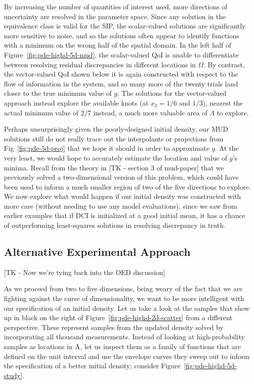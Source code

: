 By increasing the number of quantities of interest used, more directions of uncertainty are resolved in the parameter space.
Since any solution in the equivalence class is valid for the SIP, the scalar-valued solutions are significantly more sensitive to noise, and so the solutions often appear to identify functions with a minimum on the wrong half of the spatial domain.
In the left half of Figure~\ref{fig:pde-highd-5d-mud}, the scalar-valued QoI is unable to differentiate between resolving residual discrepancies in different locations in $\Omega$.
By contrast, the vector-valued QoI shown below it is again constructed with respect to the flow of information in the system, and so many more of the twenty trials land closer to the true minimum value of $g$.
The solutions for the vector-valued approach instead explore the available knots (at $x_2=1/6$ and $1/3$), nearest the actual minimum value of $2/7$ instead, a much more valuable area of $\Lambda$ to explore.

Perhaps unsurprisingly given the poorly-designed initial density, our MUD solutions still do not really trace out the interpolants or projections from Fig~\ref{fig:pde-5d-proj} that we hope it should in order to approximate $g$.
At the very least, we would hope to accurately estimate the location and value of $g$'s minima.
Recall from the theory in [TK - section 3 of mud-paper] that we previously solved a two-dimensional version of this problem, which could have been used to inform a much smaller region of two of the five directions to explore.
We now explore what would happen if our initial density was constructed with more care (without needing to use any model evaluations), since we saw from earlier examples that if DCI is initialized at a good initial mean, it has a chance of outperforming least-squares solutions in resolving discrepancy in truth.


\subsection{Alternative Experimental Approach}

[TK - Now we're tying back into the OED discussion]

As we proceed from two to five dimensions, being weary of the fact that we are fighting against the curse of dimensionality, we want to be more intelligent with our specification of an initial density.
Let us take a look at the samples that show up in black on the right of Figure~\ref{fig:pde-highd-2d-scatter} from a different perspective.
These represent samples from the updated density solved by incorporating all thousand measurements.
Instead of looking at high-probability samples as locations in ${\Lambda}$, let us inspect them as a family of functions that are defined on the unit interval and use the envelope curves they sweep out to inform the specification of a better initial density; consider Figure~\ref{fig:pde-highd-5d-study}.

